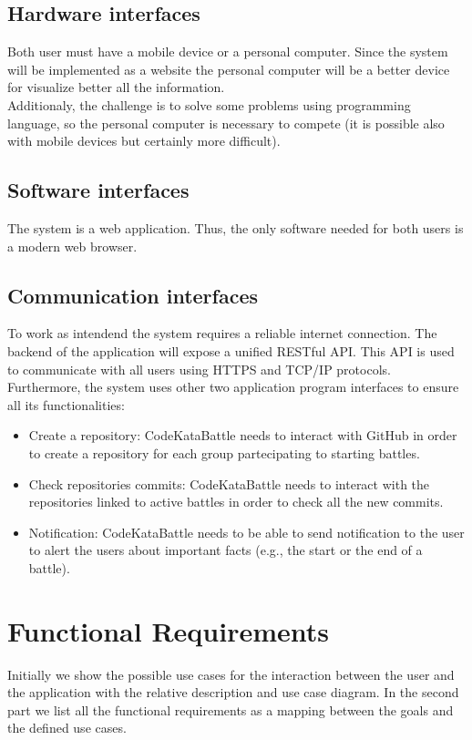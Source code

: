 \documentclass[12pt, a4paper]{report}
\newcounter{Requirements}
\begin{document}
        \subsection{Hardware interfaces}
        Both user must have a mobile device or a personal computer. 
        Since the system will be implemented as a website the personal computer will be a better device for visualize better all the information. \\
        Additionaly, the challenge is to solve some problems using programming language, so the personal computer is necessary to compete (it is possible also with mobile devices but certainly more difficult). 

        \subsection{Software interfaces}
        The system is a web application. 
        Thus, the only software needed for both users is a modern web browser. 

        \subsection{Communication interfaces}
        To work as intendend the system requires a reliable internet connection. 
        The backend of the application will expose a unified RESTful API. 
        This API is used to communicate with all users using HTTPS and TCP/IP protocols. \\
        Furthermore, the system uses other two application program interfaces to ensure all its functionalities: 
        \begin{itemize}
            \item Create a repository: CodeKataBattle needs to interact with GitHub in order to create a repository for each group partecipating to starting battles. 
            \item Check repositories commits: CodeKataBattle needs to interact with the repositories linked to active battles in order to check all the new commits. 
            \item Notification: CodeKataBattle needs to be able to send notification to the user to alert the users about important facts (e.g., the start or the end of a battle). 
        \end{itemize}

    \section{Functional Requirements}
        Initially we show the possible use cases for the interaction between the user and the application with the relative description and use case diagram. 
        In the second part we list all the functional requirements as a mapping between the goals and the defined use cases. 
\end{document}
